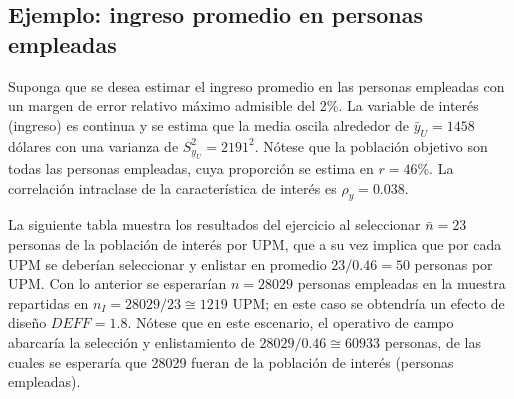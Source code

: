 \documentclass[
  12pt,
]{book}
\begin{document}
\hypertarget{ejemplo-ingreso-promedio-en-personas-empleadas}{%
\subsection{Ejemplo: ingreso promedio en personas empleadas}\label{ejemplo-ingreso-promedio-en-personas-empleadas}}

Suponga que se desea estimar el ingreso promedio en las personas empleadas con un margen de error relativo máximo admisible del 2\%. La variable de interés (ingreso) es continua y se estima que la media oscila alrededor de \(\bar{y}_U=1458\) dólares con una varianza de \(S^2_{y_U}=2191^2\). Nótese que la población objetivo son todas las personas empleadas, cuya proporción se estima en \(r = 46\)\%. La correlación intraclase de la característica de interés es \(\rho_y = 0.038\).

La siguiente tabla muestra los resultados del ejercicio al seleccionar \(\bar{n} = 23\) personas de la población de interés por UPM, que a su vez implica que por cada UPM se deberían seleccionar y enlistar en promedio \(23/0.46 = 50\) personas por UPM. Con lo anterior se esperarían \(n = 28029\) personas empleadas en la muestra repartidas en \(n_{I} = 28029 / 23 \cong 1219\) UPM; en este caso se obtendría un efecto de diseño \(DEFF = 1.8\). Nótese que en este escenario, el operativo de campo abarcaría la selección y enlistamiento de \(28029/0.46 \cong 60933\) personas, de las cuales se esperaría que 28029 fueran de la población de interés (personas empleadas).
\end{document}
